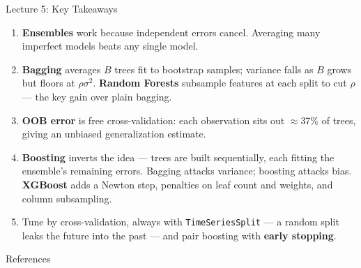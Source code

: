 \documentclass[aspectratio=169, 11pt]{beamer}
\begin{document}
\begin{frame}{Lecture 5: Key Takeaways}
  \begin{keybox}
    {\footnotesize
    \begin{enumerate}\itemsep1pt
      \item \textbf{Ensembles} work because independent errors cancel.
            Averaging many imperfect models beats any single model.

      \item \textbf{Bagging} averages $B$ trees fit to bootstrap samples;
            variance falls as $B$ grows but floors at $\rho\sigma^2$.
            \textbf{Random Forests} subsample features at each split to cut
            $\rho$ --- the key gain over plain bagging.

      \item \textbf{OOB error} is free cross-validation: each observation sits
            out $\approx$37\% of trees, giving an unbiased generalization estimate.

      \item \textbf{Boosting} inverts the idea --- trees are built sequentially,
            each fitting the ensemble's remaining errors. Bagging attacks
            variance; boosting attacks bias. \textbf{XGBoost} adds a Newton step,
            penalties on leaf count and weights, and column subsampling.

      \item Tune by cross-validation, always with \texttt{TimeSeriesSplit} ---
            a random split leaks the future into the past --- and pair boosting
            with \textbf{early stopping}.
    \end{enumerate}
    }
  \end{keybox}
\end{frame}

\begin{frame}[allowframebreaks]{References}
  \printbibliography[heading=none]
\end{frame}

\end{document}
